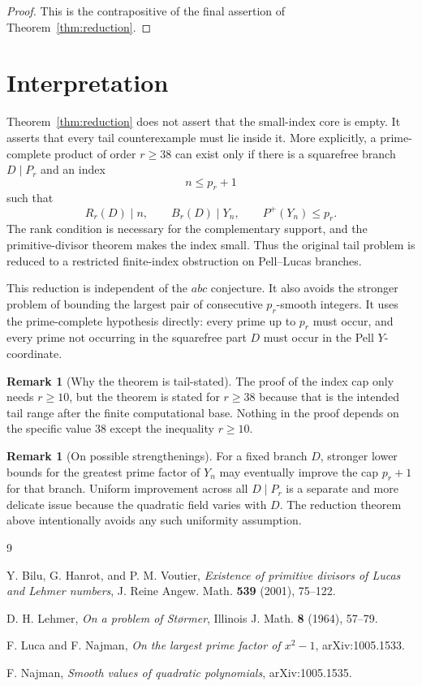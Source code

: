 \documentclass[11pt]{article}
\theoremstyle{definition}
\newtheorem{remark}[theorem]{Remark}
\begin{document}
\begin{proof}
This is the contrapositive of the final assertion of Theorem~\ref{thm:reduction}.
\end{proof}

\section{Interpretation}

Theorem~\ref{thm:reduction} does not assert that the small-index core is empty.  
It asserts that every tail counterexample must lie inside it.  More explicitly, 
a prime-complete product of order $r \ge 38$ can exist only if there is a 
squarefree branch $D\mid P_r$ and an index
\[
        n\le p_r+1
\]
such that
\[
        R_r(D)\mid n,
        \qquad
        B_r(D)\mid Y_n,
        \qquad
        P^+(Y_n)\le p_r.
\]
The rank condition is necessary for the complementary support, and the primitive-divisor 
theorem makes the index small.  Thus the original tail problem is reduced to a restricted 
finite-index obstruction on Pell--Lucas branches.

This reduction is independent of the $abc$ conjecture.  It also avoids the stronger 
problem of bounding the largest pair of consecutive $p_r$-smooth integers.  It uses the 
prime-complete hypothesis directly: every prime up to $p_r$ must occur, and every prime 
not occurring in the squarefree part $D$ must occur in the Pell $Y$-coordinate.

\begin{remark}[Why the theorem is tail-stated]
The proof of the index cap only needs $r \ge 10$, but the theorem is stated for $r \ge 38$ 
because that is the intended tail range after the finite computational base.  
Nothing in the proof depends on the specific value $38$ except the inequality $r \ge 10$.
\end{remark}

\begin{remark}[On possible strengthenings]
For a fixed branch $D$, stronger lower bounds for the greatest prime factor of $Y_n$ may 
eventually improve the cap $p_r+1$ for that branch.  Uniform improvement across all 
$D\mid P_r$ is a separate and more delicate issue because the quadratic field varies 
with $D$.  The reduction theorem above intentionally avoids any such uniformity assumption.
\end{remark}

\begin{thebibliography}{9}

Y. Bilu, G. Hanrot, and P. M. Voutier,
\emph{Existence of primitive divisors of Lucas and Lehmer numbers},
J. Reine Angew. Math. \textbf{539} (2001), 75--122.

D. H. Lehmer,
\emph{On a problem of St\o rmer},
Illinois J. Math. \textbf{8} (1964), 57--79.

F. Luca and F. Najman,
\emph{On the largest prime factor of $x^2-1$},
arXiv:1005.1533.

F. Najman,
\emph{Smooth values of quadratic polynomials},
arXiv:1005.1535.

\end{thebibliography}
\end{document}
